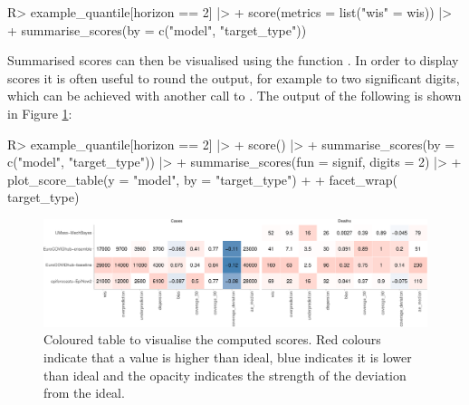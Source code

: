 \documentclass[
]{jss}
\begin{document}
\begin{CodeChunk}
\begin{CodeInput}
R> example_quantile[horizon == 2] |>
+   score(metrics = list("wis" = wis)) |>
+   summarise_scores(by = c("model", "target_type"))
\end{CodeInput}
\end{CodeChunk}

Summarised scores can then be visualised using the function
. In order to display scores it is often useful
to round the output, for example to two significant digits, which can be
achieved with another call to . The output of
the following is shown in Figure \ref{fig:score-table}:

\begin{CodeChunk}
\begin{CodeInput}
R> example_quantile[horizon == 2] |>
+   score() |>
+   summarise_scores(by = c("model", "target_type")) |>
+   summarise_scores(fun = signif, digits = 2) |>
+   plot_score_table(y = "model", by = "target_type") + 
+   facet_wrap(~ target_type)
\end{CodeInput}
\begin{figure}

{\centering \includegraphics[width=1\linewidth]{manuscript_files/figure-latex/score-table-1} 

}

\caption[Coloured table to visualise the computed scores]{Coloured table to visualise the computed scores. Red colours indicate that a value is higher than ideal, blue indicates it is lower than ideal and the opacity indicates the strength of the deviation from the ideal.}\label{fig:score-table}
\end{figure}
\end{CodeChunk}
\end{document}
